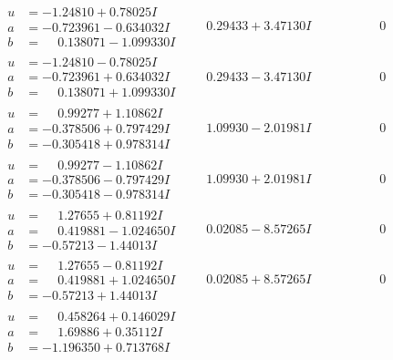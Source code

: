 \documentclass[1p]{elsarticle_modified}
\theoremstyle{definition}
\begin{document}
$$\begin{array}{c|c|c}
\begin{aligned}
u &= -1.24810 + 0.78025 I \\
a &= -0.723961 - 0.634032 I \\
b &= \phantom{-}0.138071 - 1.099330 I\end{aligned}
 & \phantom{-}0.29433 + 3.47130 I & \phantom{-0.000000 } 0 \\ \hline\begin{aligned}
u &= -1.24810 - 0.78025 I \\
a &= -0.723961 + 0.634032 I \\
b &= \phantom{-}0.138071 + 1.099330 I\end{aligned}
 & \phantom{-}0.29433 - 3.47130 I & \phantom{-0.000000 } 0 \\ \hline\begin{aligned}
u &= \phantom{-}0.99277 + 1.10862 I \\
a &= -0.378506 + 0.797429 I \\
b &= -0.305418 + 0.978314 I\end{aligned}
 & \phantom{-}1.09930 - 2.01981 I & \phantom{-0.000000 } 0 \\ \hline\begin{aligned}
u &= \phantom{-}0.99277 - 1.10862 I \\
a &= -0.378506 - 0.797429 I \\
b &= -0.305418 - 0.978314 I\end{aligned}
 & \phantom{-}1.09930 + 2.01981 I & \phantom{-0.000000 } 0 \\ \hline\begin{aligned}
u &= \phantom{-}1.27655 + 0.81192 I \\
a &= \phantom{-}0.419881 - 1.024650 I \\
b &= -0.57213 - 1.44013 I\end{aligned}
 & \phantom{-}0.02085 - 8.57265 I & \phantom{-0.000000 } 0 \\ \hline\begin{aligned}
u &= \phantom{-}1.27655 - 0.81192 I \\
a &= \phantom{-}0.419881 + 1.024650 I \\
b &= -0.57213 + 1.44013 I\end{aligned}
 & \phantom{-}0.02085 + 8.57265 I & \phantom{-0.000000 } 0 \\ \hline\begin{aligned}
u &= \phantom{-}0.458264 + 0.146029 I \\
a &= \phantom{-}1.69886 + 0.35112 I \\
b &= -1.196350 + 0.713768 I\end{aligned}

\end{array}$$
\end{document}

